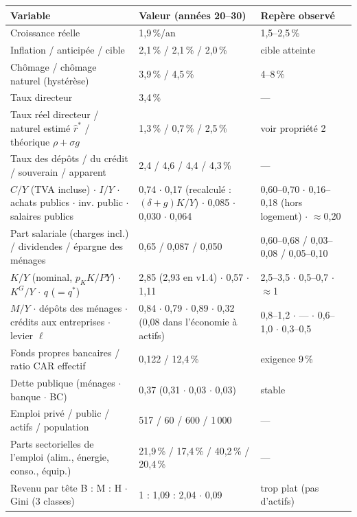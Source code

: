 \documentclass[11pt,a4paper]{article}
\begin{document}
\begin{center}\small
\begin{tabular}{p{7.4cm}p{4.2cm}p{3.6cm}}
\toprule
\textbf{Variable} & \textbf{Valeur (années 20--30)} & \textbf{Repère observé}\\
\midrule
Croissance réelle & 1,9\,\%/an & 1,5--2,5\,\%\\
Inflation / anticipée / cible & 2,1\,\% / 2,1\,\% / 2,0\,\% & cible atteinte\\
Chômage / chômage naturel (hystérèse) & 3,9\,\% / 4,5\,\% & 4--8\,\%\\
Taux directeur & 3,4\,\% & ---\\
Taux réel directeur / naturel estimé $\hat r^\ast$ / théorique $\rho+\sigma g$ & 1,3\,\% / 0,7\,\% / 2,5\,\% & voir propriété 2\\
Taux des dépôts / du crédit / souverain / apparent & 2,4 / 4,6 / 4,4 / 4,3\,\% & ---\\
$C/Y$ (TVA incluse) $\cdot$ $I/Y$ $\cdot$ achats publics $\cdot$ inv. public $\cdot$ salaires publics & 0,74 $\cdot$ 0,17 (recalculé : $(\delta+g)K/Y$) $\cdot$ 0,085 $\cdot$ 0,030 $\cdot$ 0,064 & 0,60--0,70 $\cdot$ 0,16--0,18 (hors logement) $\cdot$ $\approx$0,20\\
Part salariale (charges incl.) / dividendes / épargne des ménages & 0,65 / 0,087 / 0,050 & 0,60--0,68 / 0,03--0,08 / 0,05--0,10\\
$K/Y$ (nominal, $p_KK/PY$) $\cdot$ $K^G/Y$ $\cdot$ $q$ ($=q^\ast$) & 2,85 (2,93 en v1.4) $\cdot$ 0,57 $\cdot$ 1,11 & 2,5--3,5 $\cdot$ 0,5--0,7 $\cdot$ $\approx$1\\
$M/Y$ $\cdot$ dépôts des ménages $\cdot$ crédits aux entreprises $\cdot$ levier $\ell$ & 0,84 $\cdot$ 0,79 $\cdot$ 0,89 $\cdot$ 0,32 (0,08 dans l'économie à actifs) & 0,8--1,2 $\cdot$ --- $\cdot$ 0,6--1,0 $\cdot$ 0,3--0,5\\
Fonds propres bancaires / ratio CAR effectif & 0,122 / 12,4\,\% & exigence 9\,\%\\
Dette publique (ménages $\cdot$ banque $\cdot$ BC) & 0,37 (0,31 $\cdot$ 0,03 $\cdot$ 0,03) & stable\\
Emploi privé / public / actifs / population & 517 / 60 / 600 / 1\,000 & ---\\
Parts sectorielles de l'emploi (alim., énergie, conso., équip.) & 21,9\,\% / 17,4\,\% / 40,2\,\% / 20,4\,\% & ---\\
Revenu par tête B : M : H $\cdot$ Gini (3 classes) & 1 : 1,09 : 2,04 $\cdot$ 0,09 & trop plat (pas d'actifs)\\
\bottomrule
\end{tabular}
\end{center}
\end{document}
